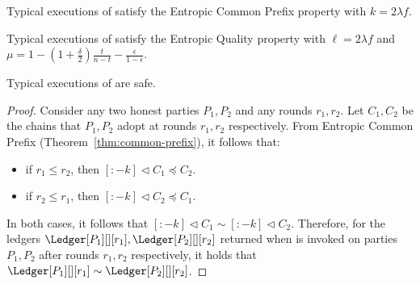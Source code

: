 \begin{theorem} \label{thm:common-prefix} 
  Typical executions of \poem satisfy the Entropic Common Prefix property
  with $k = 2 \lambda f$.
\end{theorem}

\begin{theorem} \label{thm:entoropic-quality} 
  Typical executions of \poem satisfy the Entropic Quality property
  with $\ell = 2 \lambda f$ and
  $\mu = 1 - (1 + \frac{\delta}{2})\frac{t}{n - t} - \frac{\epsilon}{1 - \epsilon}$.
\end{theorem}

\begin{conjecture}
  Typical executions of \poem are safe.
\end{conjecture}
\begin{proof}
  Consider any two honest parties $P_1, P_2$ and
  any rounds $r_1, r_2$. Let $C_1, C_2$ be the chains that $P_1, P_2$
  adopt at rounds $r_1, r_2$ respectively.
  From Entropic Common Prefix (Theorem~\ref{thm:common-prefix}), it follows that:
  \begin{itemize}
    \item if $r_1 \leq r_2$, then $[{:}{-k}] \lhd C_1 \preceq C_2$.
    \item if $r_2 \leq r_1$, then $[{:}{-k}] \lhd C_2 \preceq C_1$.
  \end{itemize}
  In both cases, it follows that $[{:}{-k}] \lhd C_1 \sim [{:}{-k}] \lhd C_2$.
  Therefore, for the ledgers $\Ledger[P_1][][r_1], \Ledger[P_2][][r_2]$ returned when
  \lread is invoked on parties $P_1, P_2$ after rounds $r_1, r_2$ respectively,
  it holds that $\Ledger[P_1][][r_1] \sim \Ledger[P_2][][r_2]$.
\end{proof}

